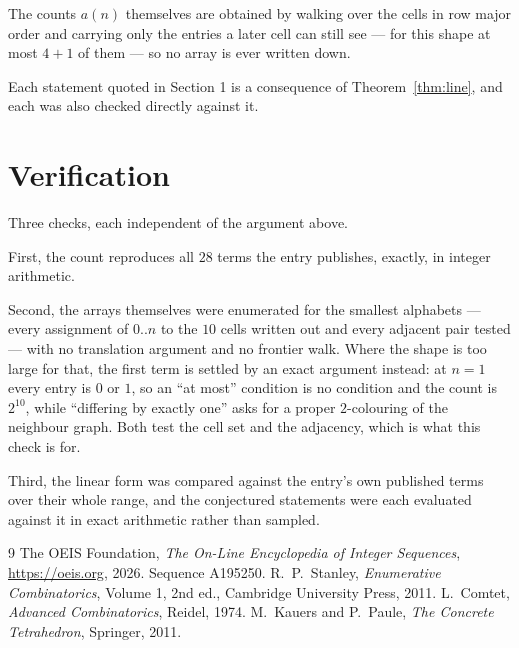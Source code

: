 \documentclass[11pt,a4paper]{article}
\theoremstyle{plain}
\theoremstyle{definition}
\begin{document}
The counts $a(n)$ themselves are obtained by walking over the cells in row major order and
carrying only the entries a later cell can still see --- for this shape at most $4+1$ of
them --- so no array is ever written down.

Each statement quoted in Section 1 is a consequence of Theorem~\ref{thm:line}, and each was
also checked directly against it.

\section{Verification}

Three checks, each independent of the argument above.

First, the count reproduces all $28$ terms the entry publishes, exactly, in integer
arithmetic.

Second, the arrays themselves were enumerated for the smallest alphabets --- every assignment
of $0..n$ to the $10$ cells written out and every adjacent pair tested --- with no
translation argument and no frontier walk. Where the shape is too large for that, the first
term is settled by an exact argument instead: at $n=1$ every entry is $0$ or $1$, so an ``at
most'' condition is no condition and the count is $2^{10}$, while ``differing by exactly
one'' asks for a proper $2$-colouring of the neighbour graph. Both test the cell set and the
adjacency, which is what this check is for.

Third, the linear form was compared against the entry's own published terms over their whole
range, and the conjectured statements were each evaluated against it in exact arithmetic
rather than sampled.

\begin{thebibliography}{9}
 The OEIS Foundation, \emph{The On-Line Encyclopedia of Integer
Sequences}, \url{https://oeis.org}, 2026. Sequence A195250.
 R.~P.~Stanley, \emph{Enumerative Combinatorics}, Volume 1, 2nd ed.,
Cambridge University Press, 2011.
 L.~Comtet, \emph{Advanced Combinatorics}, Reidel, 1974.
 M.~Kauers and P.~Paule, \emph{The Concrete Tetrahedron}, Springer, 2011.
\end{thebibliography}
\end{document}
